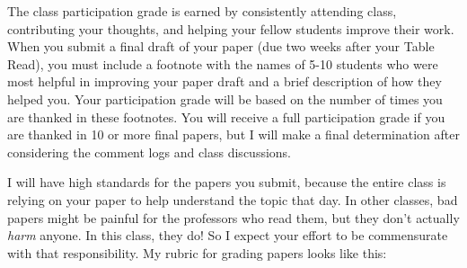 \documentclass[11pt, letterpaper]{article}
\begin{document}
The class participation grade is earned by consistently attending class, contributing your thoughts, and helping your fellow students improve their work. When you submit a final draft of your paper (due two weeks after your Table Read), you must include a footnote with the names of 5-10 students who were most helpful in improving your paper draft and a brief description of how they helped you. Your participation grade will be based on the number of times you are thanked in these footnotes. You will receive a full participation grade if you are thanked in 10 or more final papers, but I will make a final determination after considering the comment logs and class discussions.

I will have high standards for the papers you submit, because the entire class is relying on your paper to help understand the topic that day. In other classes, bad papers might be painful for the professors who read them, but they don't actually \textit{harm} anyone. In this class, they do! So I expect your effort to be commensurate with that responsibility. My rubric for grading papers looks like this:
\end{document}
